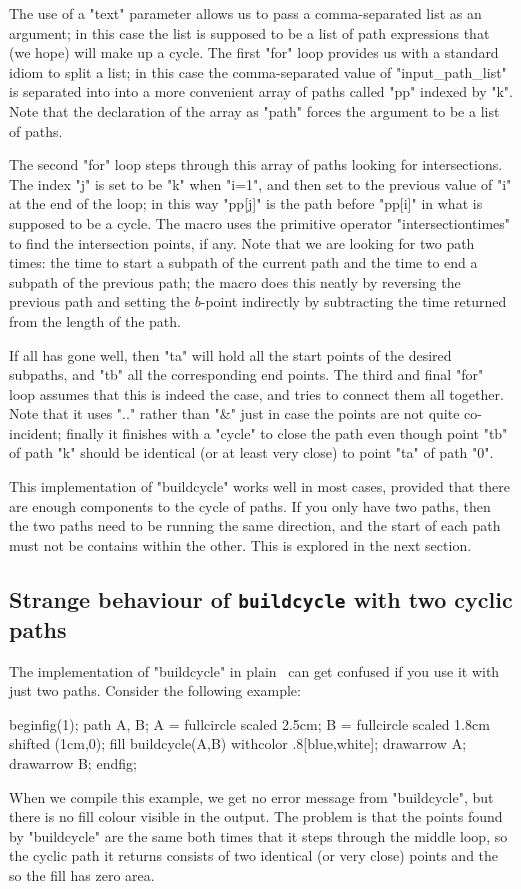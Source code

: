 \documentclass[a4paper,landscape]{article}
\def\mpic#1#2{\vadjust{\moveright5.5in\vbox to 0pt{\vskip#1\texttt{[image: \#2]}\vss}}}
\begin{document}
The use of a "text" parameter allows us to pass a comma-separated list as an
argument; in this case the list is supposed to be a list of path expressions that
(we hope) will make up a cycle.  The first "for" loop provides us with a standard
idiom to split a list; in this case the comma-separated value of "input_path_list"
is separated into into a more convenient array of paths called "pp" indexed by "k".
Note that the declaration of the array as "path" forces the argument to be a list of
paths.

The second "for" loop steps through this array of paths looking for intersections.
The index "j" is set to be "k" when "i=1", and then set to the previous value of "i"
at the end of the loop;   in this way
"pp[j]" is the path before "pp[i]" in what is supposed to be a cycle.
The macro uses the primitive operator "intersectiontimes" to find the intersection
points, if any. Note that we are looking for two path times: the time to start a
subpath of the current path and the time to end a subpath of the previous path; the
macro does this neatly 
by reversing the previous path and setting the $b$-point indirectly by subtracting
the time returned from the length of the path. 

If all has gone well, then "ta" will hold all the start points of the desired
subpaths, and "tb" all the corresponding end
points.
The third and final "for" loop assumes that this is indeed the case, and tries to 
connect them all together.  Note that it uses ".." rather than "&" just in case the
points are not quite co-incident; finally it finishes with a
"cycle" to close the path even though point "tb" of path "k" should be identical (or
at least very close) to 
point "ta" of path "0".

This implementation of "buildcycle" works well in most cases, provided that there
are enough components to the cycle of paths.  If you only have two paths, then the
two paths need to be running the same direction, and the start of each path must not
be contains within the other.  This is explored in the next section.

\newpage
\subsection{Strange behaviour of \texttt{buildcycle} with two cyclic paths}

The implementation of "buildcycle" in plain \MP\ can get confused if you use it with
just two paths.  Consider the following example: \mpic{0pt}{overlaps2}
\begin{code}
beginfig(1);
  path A, B;  
  A = fullcircle scaled 2.5cm; 
  B = fullcircle scaled 1.8cm shifted (1cm,0);
  fill buildcycle(A,B) withcolor .8[blue,white]; 
  drawarrow A; drawarrow B;
endfig;
\end{code}
When we compile this example, we get no error message from "buildcycle", but there 
is no fill colour visible in the output.  The problem is that the points found by
"buildcycle" are the same both times that it steps through the middle loop, so
the cyclic path it returns consists of two identical (or very close) points and the 
so the fill has zero area.  
\end{document}
